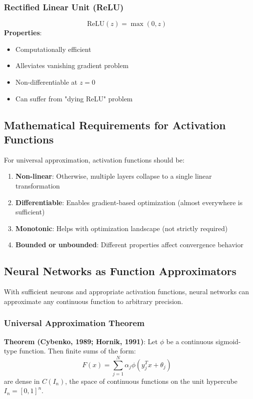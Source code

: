 \subsubsection{Rectified Linear Unit (ReLU)}
\[\text{ReLU}(z) = \max(0, z)\]
\textbf{Properties}:
\begin{itemize}
    \item Computationally efficient
    \item Alleviates vanishing gradient problem
    \item Non-differentiable at \(z = 0\)
    \item Can suffer from "dying ReLU" problem
\end{itemize}

\subsection{Mathematical Requirements for Activation Functions}
For universal approximation, activation functions should be:
\begin{enumerate}
    \item \textbf{Non-linear}: Otherwise, multiple layers collapse to a single linear transformation
    \item \textbf{Differentiable}: Enables gradient-based optimization (almost everywhere is sufficient)
    \item \textbf{Monotonic}: Helps with optimization landscape (not strictly required)
    \item \textbf{Bounded or unbounded}: Different properties affect convergence behavior
\end{enumerate}

\subsection{Neural Networks as Function Approximators}
With sufficient neurons and appropriate activation functions, neural networks can approximate any continuous function to arbitrary precision.

\subsubsection{Universal Approximation Theorem}
\textbf{Theorem (Cybenko, 1989; Hornik, 1991)}: Let \(\phi\) be a continuous sigmoid-type function. Then finite sums of the form:
\[F(x) = \sum_{j=1}^{N} \alpha_j \phi(y_j^T x + \theta_j)\]
are dense in \(C(I_n)\), the space of continuous functions on the unit hypercube \(I_n = [0,1]^n\).

